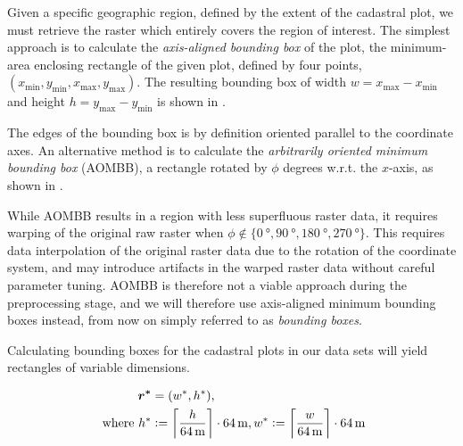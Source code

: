 Given a specific geographic region, defined by the extent of the cadastral plot, we must retrieve the raster which entirely covers the region of interest.
The simplest approach is to calculate the \textit{axis-aligned bounding box} of the plot, the minimum-area enclosing rectangle of the given plot, defined by four points, $(x_{\mathrm{min}}, y_{\mathrm{min}}, x_{\mathrm{max}}, y_{\mathrm{max}})$.
The resulting bounding box of width $w = x_{\mathrm{max}} - x_{\mathrm{min}}$ and height $h = y_{\mathrm{max}} - y_{\mathrm{min}}$ is shown in .

\begin{figure}[htb]
  \captionsetup[subfigure]{position=b}
  \centering
  \hspace{2em}
\end{figure}

The edges of the bounding box is by definition oriented parallel to the coordinate axes.
An alternative method is to calculate the \textit{arbitrarily oriented minimum bounding box} (AOMBB), a rectangle rotated by $\phi$ degrees w.r.t. the $x$-axis, as shown in .

While AOMBB results in a region with less superfluous raster data, it requires warping of the original raw raster when $\phi \not\in \{ \SI{0}{\degree}, \SI{90}{\degree}, \SI{180}{\degree}, \SI{270}{\degree} \}$.
This requires data interpolation of the original raster data due to the rotation of the coordinate system, and may introduce artifacts in the warped raster data without careful parameter tuning.
AOMBB is therefore not a viable approach during the preprocessing stage, and we will therefore use axis-aligned minimum bounding boxes instead, from now on simply referred to as \textit{bounding boxes}.

Calculating bounding boxes for the cadastral plots in our data sets will yield rectangles of variable dimensions.

\begin{align*}
  \boldsymbol{r^*} &= (w^*, h^*),
  \\
  \text{ where }
  h^* &:= \left\lceil \frac{h}{\SI{64}{\meter}} \right\rceil \cdot \SI{64}{\meter},
  w^* := \left\lceil \frac{w}{\SI{64}{\meter}} \right\rceil \cdot \SI{64}{\meter}
\end{align*}

\begin{figure}[H]
  \centering
  
\end{figure}
